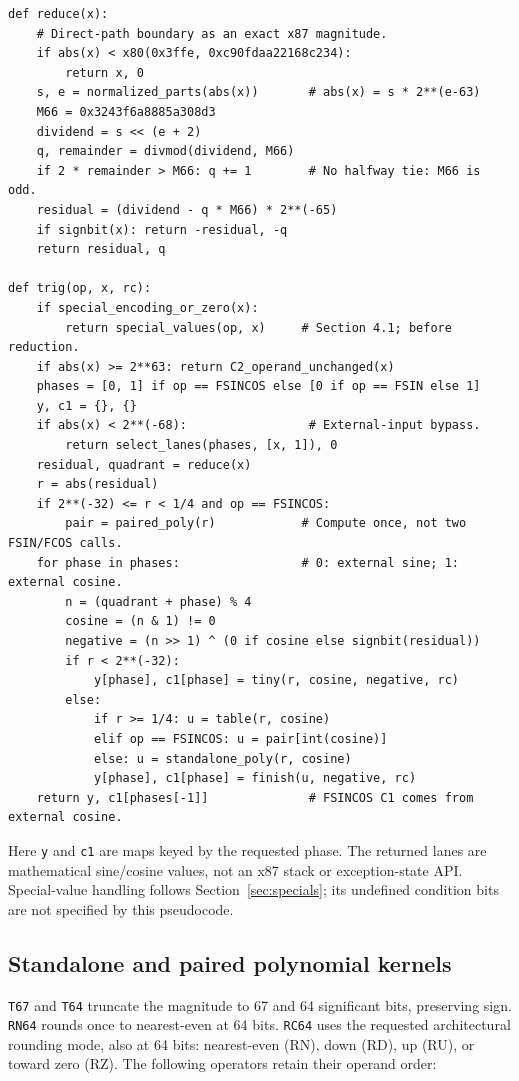 \documentclass[11pt]{article}
\begin{document}
\begin{lstlisting}[style=pseudocode]
def reduce(x):
    # Direct-path boundary as an exact x87 magnitude.
    if abs(x) < x80(0x3ffe, 0xc90fdaa22168c234):
        return x, 0
    s, e = normalized_parts(abs(x))       # abs(x) = s * 2**(e-63)
    M66 = 0x3243f6a8885a308d3
    dividend = s << (e + 2)
    q, remainder = divmod(dividend, M66)
    if 2 * remainder > M66: q += 1        # No halfway tie: M66 is odd.
    residual = (dividend - q * M66) * 2**(-65)
    if signbit(x): return -residual, -q
    return residual, q

def trig(op, x, rc):
    if special_encoding_or_zero(x):
        return special_values(op, x)     # Section 4.1; before reduction.
    if abs(x) >= 2**63: return C2_operand_unchanged(x)
    phases = [0, 1] if op == FSINCOS else [0 if op == FSIN else 1]
    y, c1 = {}, {}
    if abs(x) < 2**(-68):                 # External-input bypass.
        return select_lanes(phases, [x, 1]), 0
    residual, quadrant = reduce(x)
    r = abs(residual)
    if 2**(-32) <= r < 1/4 and op == FSINCOS:
        pair = paired_poly(r)            # Compute once, not two FSIN/FCOS calls.
    for phase in phases:                 # 0: external sine; 1: external cosine.
        n = (quadrant + phase) % 4
        cosine = (n & 1) != 0
        negative = (n >> 1) ^ (0 if cosine else signbit(residual))
        if r < 2**(-32):
            y[phase], c1[phase] = tiny(r, cosine, negative, rc)
        else:
            if r >= 1/4: u = table(r, cosine)
            elif op == FSINCOS: u = pair[int(cosine)]
            else: u = standalone_poly(r, cosine)
            y[phase], c1[phase] = finish(u, negative, rc)
    return y, c1[phases[-1]]              # FSINCOS C1 comes from external cosine.
\end{lstlisting}

\noindent Here \texttt{y} and \texttt{c1} are maps keyed by the requested
phase. The returned lanes are mathematical sine/cosine values, not an x87
stack or exception-state API. Special-value handling follows
Section~\ref{sec:specials}; its undefined condition bits are not specified
by this pseudocode.

\clearpage
\subsection{Standalone and paired polynomial kernels}

\texttt{T67} and \texttt{T64} truncate the magnitude to 67 and 64 significant
bits, preserving sign. \texttt{RN64} rounds once to nearest-even at 64 bits.
\texttt{RC64} uses the requested architectural rounding mode, also at 64 bits:
nearest-even (RN), down (RD), up (RU), or toward zero (RZ).
The following operators retain their operand order:
\end{document}
